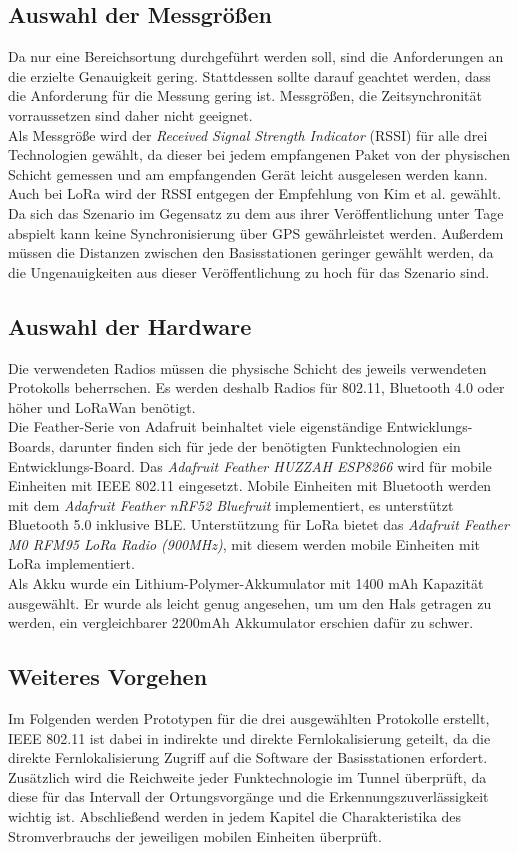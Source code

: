 \subsection{Auswahl der Messgrößen}
Da nur eine Bereichsortung durchgeführt werden soll, sind die Anforderungen an die erzielte Genauigkeit gering.
Stattdessen sollte darauf geachtet werden, dass die Anforderung für die Messung gering ist.
Messgrößen, die Zeitsynchronität vorraussetzen sind daher nicht geeignet.\\
Als Messgröße wird der \emph{Received Signal Strength Indicator} (RSSI) für alle drei Technologien gewählt, da dieser bei jedem empfangenen Paket von der physischen Schicht gemessen und am empfangenden Gerät leicht ausgelesen werden kann.\\
Auch bei LoRa wird der RSSI entgegen der Empfehlung von Kim et al. gewählt.
Da sich das Szenario im Gegensatz zu dem aus ihrer  Veröffentlichung unter Tage abspielt kann keine Synchronisierung über GPS gewährleistet werden. 
Außerdem müssen die Distanzen zwischen den Basisstationen geringer gewählt werden, da die Ungenauigkeiten aus dieser Veröffentlichung zu hoch für das Szenario sind.

\subsection{Auswahl der Hardware}
Die verwendeten Radios müssen die physische Schicht des jeweils verwendeten Protokolls beherrschen.
Es werden deshalb Radios für 802.11, Bluetooth 4.0 oder höher und LoRaWan benötigt.\\
Die Feather-Serie von Adafruit beinhaltet viele eigenständige Entwicklungs-Boards, darunter finden sich für jede der benötigten Funktechnologien ein Entwicklungs-Board.
Das \textit{Adafruit Feather HUZZAH ESP8266} wird für mobile Einheiten mit IEEE 802.11 eingesetzt.
Mobile Einheiten mit Bluetooth werden mit dem \textit{Adafruit Feather nRF52 Bluefruit} implementiert, es unterstützt Bluetooth 5.0 inklusive BLE.
Unterstützung für LoRa bietet das \textit{Adafruit Feather M0 RFM95 LoRa Radio (900MHz)}, mit diesem werden mobile Einheiten mit LoRa implementiert.\\
Als Akku wurde ein Lithium-Polymer-Akkumulator mit 1400 mAh Kapazität ausgewählt.
Er wurde als leicht genug angesehen, um um den Hals getragen zu werden, ein vergleichbarer 2200mAh Akkumulator erschien dafür zu schwer.


\subsection{Weiteres Vorgehen}
Im Folgenden werden Prototypen für die drei ausgewählten Protokolle erstellt, IEEE 802.11 ist dabei in indirekte und direkte Fernlokalisierung geteilt, da die direkte Fernlokalisierung Zugriff auf die Software der Basisstationen erfordert.
Zusätzlich wird die Reichweite jeder Funktechnologie im Tunnel überprüft, da diese für das Intervall der Ortungsvorgänge und die Erkennungszuverlässigkeit wichtig ist.
Abschließend werden in jedem Kapitel die Charakteristika des Stromverbrauchs der jeweiligen mobilen Einheiten überprüft.
